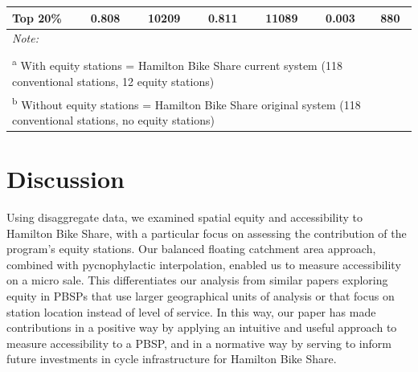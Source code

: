 \documentclass[]{elsarticle} %
\begin{document}
\begin{table}
{\begin{tabular}[t]{lcccccc}
\hspace{1em}Top 20\% & 0.808 & 10209 & 0.811 & 11089 & 0.003 & 880\\
\bottomrule
\multicolumn{7}{l}{\rule{0pt}{1em}\textit{Note: }}\\
\multicolumn{7}{l}{\rule{0pt}{1em} }\\
\multicolumn{7}{l}{\rule{0pt}{1em}\textsuperscript{a} With equity stations = Hamilton Bike Share current system (118 conventional stations, 12 equity stations)}\\
\multicolumn{7}{l}{\rule{0pt}{1em}\textsuperscript{b} Without equity stations = Hamilton Bike Share original system (118 conventional stations, no equity stations)}\\
\end{tabular}}
\end{table}

\hypertarget{discussion}{%
\section{Discussion}\label{discussion}}

Using disaggregate data, we examined spatial equity and accessibility to
Hamilton Bike Share, with a particular focus on assessing the
contribution of the program's equity stations. Our balanced floating
catchment area approach, combined with pycnophylactic interpolation,
enabled us to measure accessibility on a micro sale. This differentiates
our analysis from similar papers exploring equity in PBSPs that use
larger geographical units of analysis or that focus on station location
instead of level of service. In this way, our paper has made
contributions in a positive way by applying an intuitive and useful
approach to measure accessibility to a PBSP, and in a normative way by
serving to inform future investments in cycle infrastructure for
Hamilton Bike Share.
\end{document}

